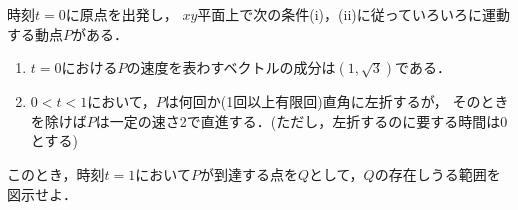 \documentclass[../../main.tex]{subfiles}
\begin{document}
時刻$t=0$に原点を出発し，
$xy$平面上で次の条件(i)，(ii)に従っていろいろに運動する動点$P$がある．
\begin{enumerate}
  \item[(i)] $t=0$における$P$の速度を表わすベクトルの成分は$(1,\sqrt{3})$である．
  \item[(ii)] $0<t<1$において，$P$は何回か(1回以上有限回)直角に左折するが，
    そのときを除けば$P$は一定の速さ2で直進する．(ただし，左折するのに要する時間は0とする)
\end{enumerate}
このとき，時刻$t=1$において$P$が到達する点を$Q$として，$Q$の存在しうる範囲を図示せよ．
\end{document}
